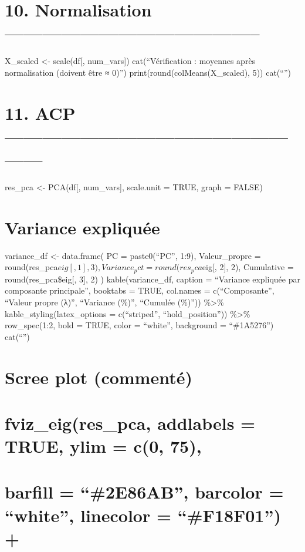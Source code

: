 \documentclass[
]{article}
\begin{document}
\section{10. Normalisation
-----------------------------------------}\label{normalisation}

X\_scaled \textless- scale(df{[}, num\_vars{]}) cat(``Vérification :
moyennes après normalisation (doivent être ≈ 0)\n'')
print(round(colMeans(X\_scaled), 5)) cat(``\n'')

\section{11. ACP
---------------------------------------------------}\label{acp}

res\_pca \textless- PCA(df{[}, num\_vars{]}, scale.unit = TRUE, graph =
FALSE)

\section{Variance expliquée}\label{variance-expliquuxe9e}

variance\_df \textless- data.frame( PC = paste0(``PC'', 1:9),
Valeur\_propre = round(res\_pca\(eig[, 1], 3),
  Variance_pct  = round(res_pca\)eig{[}, 2{]}, 2), Cumulative =
round(res\_pca\$eig{[}, 3{]}, 2) ) kable(variance\_df, caption =
``Variance expliquée par composante principale'', booktabs = TRUE,
col.names = c(``Composante'', ``Valeur propre (λ)'', ``Variance (\%)'',
``Cumulée (\%)'')) \%\textgreater\% kable\_styling(latex\_options =
c(``striped'', ``hold\_position'')) \%\textgreater\% row\_spec(1:2, bold
= TRUE, color = ``white'', background = ``\#1A5276'') cat(``\n'')

\section{Scree plot (commenté)}\label{scree-plot-commentuxe9}

\section{fviz\_eig(res\_pca, addlabels = TRUE, ylim = c(0,
75),}\label{fviz_eigres_pca-addlabels-true-ylim-c0-75}

\section{barfill = ``\#2E86AB'', barcolor = ``white'', linecolor =
``\#F18F01'') +}\label{barfill-2e86ab-barcolor-white-linecolor-f18f01}
\end{document}
